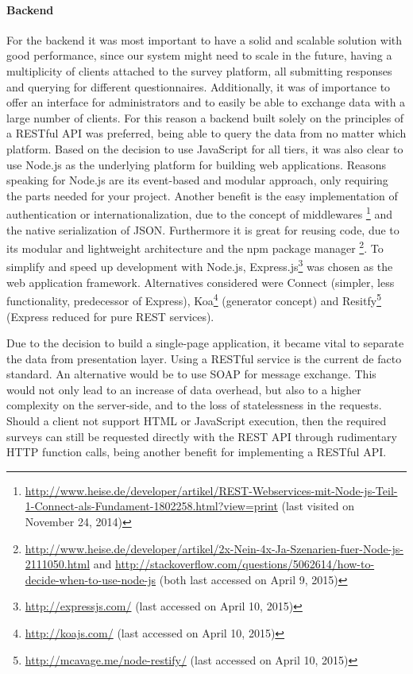 	\paragraph{Backend}

		For the backend it was most important to have a solid and scalable solution with good performance, since our system might need to scale in the future, having a multiplicity of clients attached to the survey platform, all submitting responses and querying for different questionnaires. Additionally, it was of importance to offer an interface for administrators and to easily be able to exchange data with a large number of clients. For this reason a backend built solely on the principles of a RESTful API was preferred, being able to query the data from no matter which platform.
		Based on the decision to use JavaScript for all tiers, it was also clear to use Node.js as the underlying platform for building web applications. Reasons speaking for Node.js are its event-based and modular approach, only requiring the parts needed for your project. Another benefit is the easy implementation of authentication or internationalization, due to the concept of middlewares \footnote{\url{http://www.heise.de/developer/artikel/REST-Webservices-mit-Node-js-Teil-1-Connect-als-Fundament-1802258.html?view=print} (last visited on November 24, 2014)} and the native serialization of JSON. Furthermore it is great for reusing code, due to its modular and lightweight architecture and the npm package manager \footnote{\url{http://www.heise.de/developer/artikel/2x-Nein-4x-Ja-Szenarien-fuer-Node-js-2111050.html} and \url{http://stackoverflow.com/questions/5062614/how-to-decide-when-to-use-node-js} (both last accessed on April 9, 2015)}. To simplify and speed up development with Node.js, Express.js\footnote{\url{http://expressjs.com/} (last accessed on April 10, 2015)} was chosen as the web application framework. Alternatives considered were Connect (simpler, less functionality, predecessor of Express), Koa\footnote{\url{http://koajs.com/} (last accessed on April 10, 2015)} (generator concept) and Resitfy\footnote{\url{http://mcavage.me/node-restify/} (last accessed on April 10, 2015)} (Express reduced for pure REST services). 

		Due to the decision to build a single-page application, it became vital to separate the data from presentation layer. Using a RESTful service is the current de facto standard. An alternative would be to use SOAP for message exchange. This would not only lead to an increase of data overhead, but also to a higher complexity on the server-side, and to the loss of statelessness in the requests. Should a client not support HTML or JavaScript execution, then the required surveys can still be requested directly with the REST API through rudimentary HTTP function calls, being another benefit for implementing a RESTful API.

